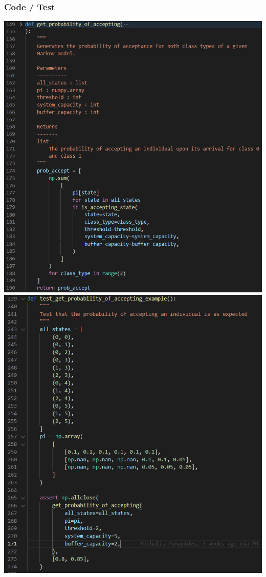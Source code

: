 \begin{frame}
    \frametitle{Code / Test}
    \centering

    \includegraphics[scale=0.362]{Bin/code.PNG}
    \includegraphics[scale=0.37]{Bin/test.PNG}

\end{frame}


